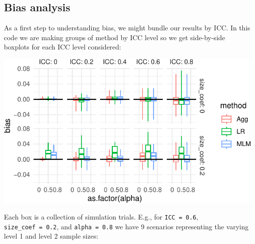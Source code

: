 \documentclass[
]{book}
\newenvironment{Shaded}{\begin{snugshade}}{\end{snugshade}}
\newcommand{\AttributeTok}[1]{\textcolor[rgb]{0.77,0.63,0.00}{#1}}
\newcommand{\ConstantTok}[1]{\textcolor[rgb]{0.00,0.00,0.00}{#1}}
\newcommand{\DecValTok}[1]{\textcolor[rgb]{0.00,0.00,0.81}{#1}}
\newcommand{\FunctionTok}[1]{\textcolor[rgb]{0.00,0.00,0.00}{#1}}
\newcommand{\NormalTok}[1]{#1}
\newcommand{\SpecialCharTok}[1]{\textcolor[rgb]{0.00,0.00,0.00}{#1}}
\begin{document}
\hypertarget{bias-analysis}{%
\subsection{Bias analysis}\label{bias-analysis}}

As a first step to understanding bias, we might bundle our results by ICC.
In this code we are making groups of method by ICC level so we get side-by-side boxplots for each ICC level considered:

\begin{Shaded}
\end{Shaded}

\begin{center}\includegraphics[width=0.75\linewidth]{Designing-Simulations-in-R_files/figure-latex/clusterRCT_plot_bias_v1-1} \end{center}

Each box is a collection of simulation trials. E.g., for \texttt{ICC\ =\ 0.6}, \texttt{size\_coef\ =\ 0.2}, and \texttt{alpha\ =\ 0.8} we have 9 scenarios representing the varying level 1 and level 2 sample sizes:
\end{document}
